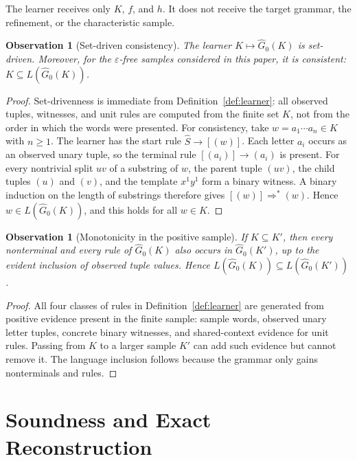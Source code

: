 \documentclass[11pt,a4paper]{article}
\newtheorem{observation}[theorem]{Observation}
\theoremstyle{remark}
\newcommand{\eps}{\varepsilon}
\begin{document}
The learner receives only \(K\), \(f\), and \(h\).  It does not receive the
target grammar, the refinement, or the characteristic sample.


\begin{observation}[Set-driven consistency]
\label{obs:set-driven-consistent}
The learner $K\mapsto\widehat G_0(K)$ is set-driven.  Moreover, for the
$\eps$-free samples considered in this paper, it is consistent:
$K\subseteq L(\widehat G_0(K))$.
\end{observation}

\begin{proof}
Set-drivenness is immediate from Definition~\ref{def:learner}: all observed
tuples, witnesses, and unit rules are computed from the finite set $K$, not
from the order in which the words were presented.  For consistency, take
$w=a_1\cdots a_n\in K$ with $n\ge1$.  The learner has the start rule
$\widehat S\to[(w)]$.  Each letter $a_i$ occurs as an observed unary tuple, so
the terminal rule $[(a_i)]\to(a_i)$ is present.  For every nontrivial split
$uv$ of a substring of $w$, the parent tuple $(uv)$, the child tuples $(u)$ and
$(v)$, and the template $x^1y^1$ form a binary witness.  A binary induction on
the length of substrings therefore gives $[(w)]\Rightarrow^*(w)$.  Hence
$w\in L(\widehat G_0(K))$, and this holds for all $w\in K$.
\end{proof}

\begin{observation}[Monotonicity in the positive sample]
\label{obs:learner-monotone}
If \(K\subseteq K'\), then every nonterminal and every rule of
\(\widehat G_0(K)\) also occurs in \(\widehat G_0(K')\), up to the evident
inclusion of observed tuple values.  Hence
\(L(\widehat G_0(K))\subseteq L(\widehat G_0(K'))\).
\end{observation}

\begin{proof}
All four classes of rules in Definition~\ref{def:learner} are generated from
positive evidence present in the finite sample: sample words, observed unary
letter tuples, concrete binary witnesses, and shared-context evidence for unit
rules.  Passing from \(K\) to a larger sample \(K'\) can add such evidence but
cannot remove it.  The language inclusion follows because the grammar only gains
nonterminals and rules.
\end{proof}


\section{Soundness and Exact Reconstruction}
\label{sec:exact}
\end{document}
